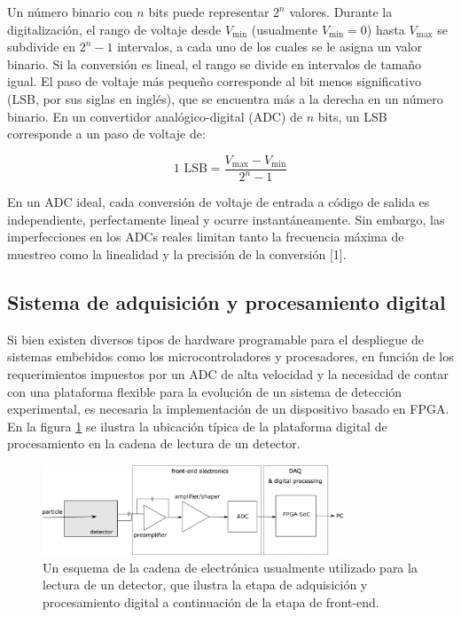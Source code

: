 \documentclass[]{book}
\begin{document}
\noindent Un número binario con $n$ bits puede representar $2^{n}$ valores. Durante la digitalización, el rango de voltaje desde $V_{\text{min}}$ (usualmente $V_{\text{min}} = 0$) hasta $V_{\text{max}}$ se subdivide en $2^{n} - 1$ intervalos, a cada uno de los cuales se le asigna un valor binario. Si la conversión es lineal, el rango se divide en intervalos de tamaño igual. El paso de voltaje más pequeño corresponde al bit menos significativo (LSB, por sus siglas en inglés), que se encuentra más a la derecha en un número binario. En un convertidor analógico-digital (ADC) de $n$ bits, un LSB corresponde a un paso de voltaje de:

$$
1 \text{ LSB} = \frac{V_{\text{max}} - V_{\text{min}}}{2^n - 1}
$$

\noindent En un ADC ideal, cada conversión de voltaje de entrada a código de salida es independiente, perfectamente lineal y ocurre instantáneamente. Sin embargo, las imperfecciones en los ADCs reales limitan tanto la frecuencia máxima de muestreo como la linealidad y la precisión de la conversión [1]. 


\subsection{Sistema de adquisición y procesamiento digital}

\noindent Si bien existen diversos tipos de hardware programable para el despliegue de sistemas embebidos como los microcontroladores y procesadores, en función de los requerimientos impuestos por un ADC de alta velocidad y la necesidad de contar con una plataforma flexible para la evolución de un sistema de detección experimental, es necesaria la implementación de un dispositivo basado en FPGA. En la figura \ref{fig:pulse_chain} se ilustra la ubicación típica de la plataforma digital de procesamiento en la cadena de lectura de un detector.

\begin{figure}[h]
    \centering
    \includegraphics[width=0.8\textwidth]{pulse_chain_generic.png}
    \caption{Un esquema de la cadena de electrónica usualmente utilizado para la lectura de un
    detector, que ilustra la etapa de adquisición y procesamiento digital a continuación de la etapa de front-end.}
    \label{fig:pulse_chain}

\end{figure}
\end{document}
